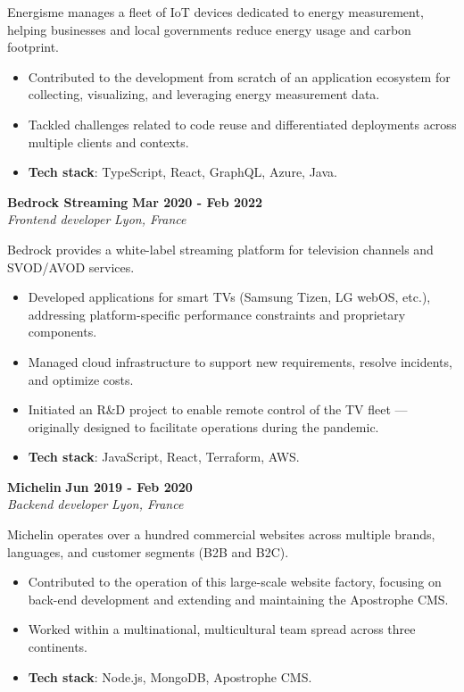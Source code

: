 \documentclass[11pt]{article}
\newcommand{\experience}[4]{%
  \vspace{5pt}
  \textbf{#2} \hfill \textbf{#3} \\
  \textit{#1} \hfill \textit{#4} \\
  \vspace{-10pt}
}
\begin{document}
Energisme manages a fleet of IoT devices dedicated to energy measurement, helping businesses and local governments reduce energy usage and carbon footprint.

\begin{itemize}
    \item Contributed to the development from scratch of an application ecosystem for collecting, visualizing, and leveraging energy measurement data.
    \item Tackled challenges related to code reuse and differentiated deployments across multiple clients and contexts.
    \item \textbf{Tech stack}: TypeScript, React, GraphQL, Azure, Java.
\end{itemize}

\experience{Frontend developer}{Bedrock Streaming}{Mar 2020 - Feb 2022}{Lyon, France}

Bedrock provides a white-label streaming platform for television channels and SVOD/AVOD services.

\begin{itemize}
    \item Developed applications for smart TVs (Samsung Tizen, LG webOS, etc.), addressing platform-specific performance constraints and proprietary components.
    \item Managed cloud infrastructure to support new requirements, resolve incidents, and optimize costs.
    \item Initiated an R\&D project to enable remote control of the TV fleet — originally designed to facilitate operations during the pandemic.
    \item \textbf{Tech stack}: JavaScript, React, Terraform, AWS.
\end{itemize}


\experience{Backend developer}{Michelin}{Jun 2019 - Feb 2020}{Lyon, France}

Michelin operates over a hundred commercial websites across multiple brands, languages, and customer segments (B2B and B2C).

\begin{itemize}
    \item Contributed to the operation of this large-scale website factory, focusing on back-end development and extending and maintaining the Apostrophe CMS.
    \item Worked within a multinational, multicultural team spread across three continents.
    \item \textbf{Tech stack}: Node.js, MongoDB, Apostrophe CMS.
\end{itemize}
\end{document}
